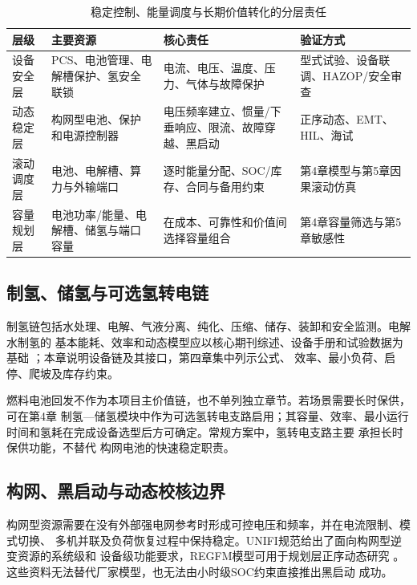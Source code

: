 \begin{table}[H]
\centering
\caption{稳定控制、能量调度与长期价值转化的分层责任}
\label{tab:c3-storage-responsibility}
\begin{tabularx}{\textwidth}{p{2.6cm} p{3cm} X X}
\toprule
{\bfseries 层级} & {\bfseries 主要资源} & {\bfseries 核心责任} & {\bfseries 验证方式}\\
\midrule
设备安全层 & PCS、电池管理、电解槽保护、氢安全联锁 & 电流、电压、温度、压力、气体与故障保护 & 型式试验、设备联调、HAZOP/安全审查\\
动态稳定层 & 构网型电池、保护和电源控制器 & 电压频率建立、惯量/下垂响应、限流、故障穿越、黑启动 & 正序动态、EMT、HIL、海试\\
滚动调度层 & 电池、电解槽、算力与外输端口 & 逐时能量分配、SOC/库存、合同与备用约束 & 第4章模型与第5章因果滚动仿真\\
容量规划层 & 电池功率/能量、电解槽、储氢与端口容量 & 在成本、可靠性和价值间选择容量组合 & 第4章容量筛选与第5章敏感性\\
\bottomrule
\end{tabularx}
\end{table}

\subsection{制氢、储氢与可选氢转电链}

制氢链包括水处理、电解、气液分离、纯化、压缩、储存、装卸和安全监测。电解水制氢的
基本能耗、效率和动态模型应以核心期刊综述、设备手册和试验数据为基础
\cite{ursua2012,carmo2013,buttler2018}；本章说明设备链及其接口，第四章集中列示公式、
效率、最小负荷、启停、爬坡及库存约束。

燃料电池回发不作为本项目主价值链，也不单列独立章节。若场景需要长时保供，可在第4章
制氢—储氢模块中作为可选氢转电支路启用；其容量、效率、最小运行时间和氢耗在完成设备选型后方可确定。常规方案中，氢转电支路主要
承担长时保供功能，不替代
构网电池的快速稳定职责。

\subsection{构网、黑启动与动态校核边界}

构网型资源需要在没有外部强电网参考时形成可控电压和频率，并在电流限制、模式切换、
多机并联及负荷恢复过程中保持稳定。UNIFI规范给出了面向构网型逆变资源的系统级和
设备级功能要求\cite{unifi-v3}，REGFM模型可用于规划层正序动态研究
\cite{regfm-b1}。这些资料无法替代厂家模型，也无法由小时级SOC约束直接推出黑启动
成功。

